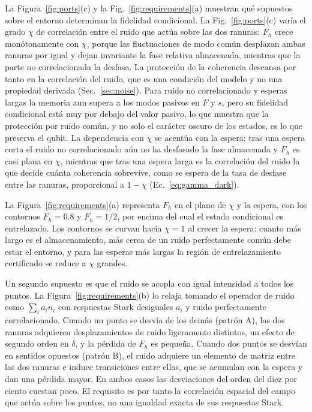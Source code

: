 \documentclass[aps,pra,twocolumn,groupedaddress,amsmath,amssymb,floatfix]{revtex4-2}
\begin{document}
La Figura~\ref{fig:ports}(c) y la Fig.~\ref{fig:requirements}(a) muestran qu\'e supuestos sobre el entorno determinan la fidelidad condicional. La Fig.~\ref{fig:ports}(c) var\'ia el grado $\chi$ de correlaci\'on entre el ruido que act\'ua sobre las dos ranuras: $F_h$ crece mon\'otonamente con $\chi$, porque las fluctuaciones de modo com\'un desplazan ambas ranuras por igual y dejan invariante la fase relativa almacenada, mientras que la parte no correlacionada la desfasa. La protecci\'on de la coherencia descansa por tanto en la correlaci\'on del ruido, que es una condici\'on del modelo y no una propiedad derivada (Sec.~\ref{sec:noise}). Para ruido no correlacionado y esperas largas la memoria aun supera a los modos pasivos en $F$ y $s$, pero su fidelidad condicional est\'a muy por debajo del valor pasivo, lo que muestra que la protecci\'on por ruido com\'un, y no solo el car\'acter oscuro de los estados, es lo que preserva el qubit. La dependencia con $\chi$ se acent\'ua con la espera: tras una espera corta el ruido no correlacionado a\'un no ha desfasado la fase almacenada y $F_h$ es casi plana en $\chi$, mientras que tras una espera larga es la correlaci\'on del ruido la que decide cu\'anta coherencia sobrevive, como se espera de la tasa de desfase entre las ranuras, proporcional a $1-\chi$ (Ec.~\eqref{eq:gamma_dark}).

La Figura~\ref{fig:requirements}(a) representa $F_h$ en el plano de $\chi$ y la espera, con los contornos $F_h=0.8$ y $F_h=1/2$, por encima del cual el estado condicional es entrelazado. Los contornos se curvan hacia $\chi=1$ al crecer la espera: cuanto m\'as largo es el almacenamiento, m\'as cerca de un ruido perfectamente com\'un debe estar el entorno, y para las esperas m\'as largas la regi\'on de entrelazamiento certificado se reduce a $\chi$ grandes.

Un segundo supuesto es que el ruido se acopla con igual intensidad a todos los puntos. La Figura~\ref{fig:requirements}(b) lo relaja tomando el operador de ruido como $\sum_i a_i n_i$ con respuestas Stark desiguales $a_i$ y ruido perfectamente correlacionado. Cuando un punto se desv\'ia de los dem\'as (patr\'on A), las dos ranuras adquieren desplazamientos de ruido ligeramente distintos, un efecto de segundo orden en $\delta$, y la p\'erdida de $F_h$ es peque\~na. Cuando dos puntos se desv\'ian en sentidos opuestos (patr\'on B), el ruido adquiere un elemento de matriz entre las dos ranuras e induce transiciones entre ellas, que se acumulan con la espera y dan una p\'erdida mayor. En ambos casos las desviaciones del orden del diez por ciento cuestan poco. El requisito es por tanto la correlaci\'on espacial del campo que act\'ua sobre los puntos, no una igualdad exacta de sus respuestas Stark.
\end{document}
